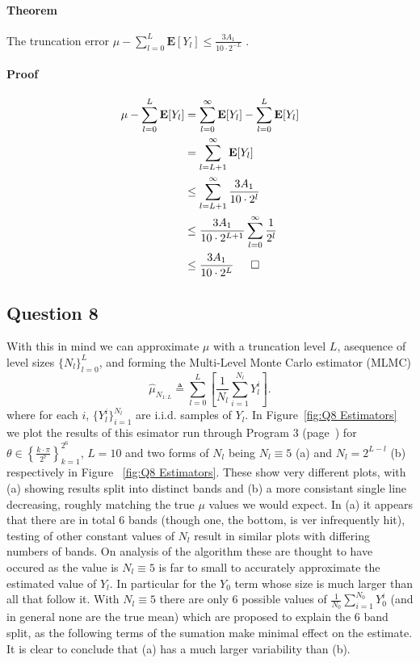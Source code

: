 \documentclass{article}
\begin{document}
\paragraph{Theorem} The truncation error $\mu - \sum_{l=0}^L \textbf{E}[Y_l] \leq \frac{3A_1}{10 \cdot 2^{-L}}$ .
\paragraph{Proof} 
\begin{equation*}
\begin{split}
\mu - \sum_{l=0}^L \textbf{E}[Y_l] &= \sum_{l=0}^\infty \textbf{E}[Y_l] - \sum_{l=0}^L \textbf{E}[Y_l] \\
&= \sum_{l=L+1}^\infty \textbf{E}[Y_l] \\
&\leq \sum_{l=L+1}^\infty \frac{3A_1}{10 \cdot 2^l} \\
&\leq \frac{3A_1}{10 \cdot 2^{L+1}} \sum_{l=0}^\infty \frac{1}{2^l} \\
&\leq \frac{3A_1}{10 \cdot 2^{L}} \indent{} \Box
\end{split}
\end{equation*}

\subsection{Question 8}

With this in mind we can approximate $\mu$ with a truncation level $L$, asequence of level sizes $\{N_l\}_{l=0}^L$, and forming the Multi-Level Monte Carlo estimator (MLMC)
\begin{equation}
\hat\mu_{N_{1:L}} \triangleq \sum_{l=0}^L \left[ \frac{1}{N_l} \sum_{i=1}^{N_l} Y_l^i \right].
\end{equation}
where for each $i$, $\{Y_l^i\}_{i=1}^{N_l}$ are i.i.d. samples of $Y_l$. In Figure~\ref{fig:Q8 Estimators} we plot the results of this esimator run through Program 3 (page~\pageref{subsec:Program 3}) for $\theta \in \left\{ \frac{k \cdot \pi}{2^7} \right\}_{k=1}^{2^6}$, $L=10$ and two forms of $N_l$ being $N_l \equiv 5$ (a) and $N_l = 2^{L-l}$ (b) respectively in Figure ~\ref{fig:Q8 Estimators}. These show very different plots, with (a) showing results split into distinct bands and (b) a more consistant single line decreasing, roughly matching the true $\mu$ values we would expect. In (a) it appears that there are in total 6 bands (though one, the bottom, is ver infrequently hit), testing of other constant values of $N_l$ result in similar plots with differing numbers of bands. On analysis of the algorithm these are thought to have occured as the value is $N_l \equiv 5$ is far to small to accurately approximate the estimated value of $Y_l$. In particular for the $Y_0$ term whose size is much larger than all that follow it. With $N_l \equiv 5$ there are only 6 possible values of $\frac{1}{N_0} \sum_{i=1}^{N_0} Y_0^i$ (and in general none are the true mean) which are proposed to explain the 6 band split, as the following terms of the sumation make minimal effect on the estimate. It is clear to conclude that (a) has a much larger variability than (b).
\end{document}
